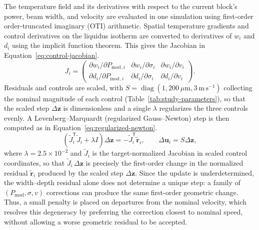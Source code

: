 \documentclass[11pt]{article}
\newcommand{\Pmod}{P_{\mathrm{mod}}}
\begin{document}
The temperature field and its derivatives with respect to the current
block's power, beam width, and velocity are evaluated in one simulation using
first-order order-truncated imaginary (OTI) arithmetic. Spatial temperature
gradients and control derivatives on the liquidus isotherm are converted to
derivatives of $w_i$ and $d_i$ using the implicit function theorem. This gives
the Jacobian in Equation~\eqref{eq:control-jacobian}.
\begin{equation}
  J_i =
  \begin{pmatrix}
    \partial w_i/\partial\Pmod{}_{,i} &
    \partial w_i/\partial\sigma_i &
    \partial w_i/\partial v_i\\
    \partial d_i/\partial\Pmod{}_{,i} &
    \partial d_i/\partial\sigma_i &
    \partial d_i/\partial v_i
  \end{pmatrix}.
  \label{eq:control-jacobian}
\end{equation}
Residuals and controls are scaled, with
$S=\operatorname{diag}(1,200~\mu\mathrm{m},3~\mathrm{m\,s^{-1}})$ collecting the
nominal magnitude of each control (Table~\ref{tab:study-parameters}), so that
the scaled step $\Delta\mathbf z$ is dimensionless and a single $\lambda$
regularizes the three controls evenly. A Levenberg--Marquardt (regularized
Gauss--Newton) step is then computed as in Equation~\eqref{eq:regularized-newton}.
\begin{equation}
  (\widetilde J_i^{\mathsf T}\widetilde J_i+\lambda I)\Delta\mathbf z
  =-\widetilde J_i^{\mathsf T}\widetilde{\mathbf r}_i,
  \qquad
  \Delta\mathbf u_i=S\Delta\mathbf z,
  \label{eq:regularized-newton}
\end{equation}
where $\lambda=2.5\times10^{-2}$ and $\widetilde J_i$ is the target-normalized
Jacobian in scaled control coordinates,
so that $\widetilde J_i\,\Delta\mathbf z$ is precisely the first-order change in
the normalized residual $\widetilde{\mathbf r}_i$ produced by the scaled step
$\Delta\mathbf z$. Since the update is underdetermined, the width--depth
residual alone does not determine a unique step: a family of $(\Pmod,\sigma,v)$
corrections can produce the same first-order geometric change. Thus, a small penalty is
 placed on departures from the nominal velocity, which resolves this
degeneracy by preferring the correction closest to nominal speed, without
allowing a worse geometric residual to be accepted.
\end{document}
